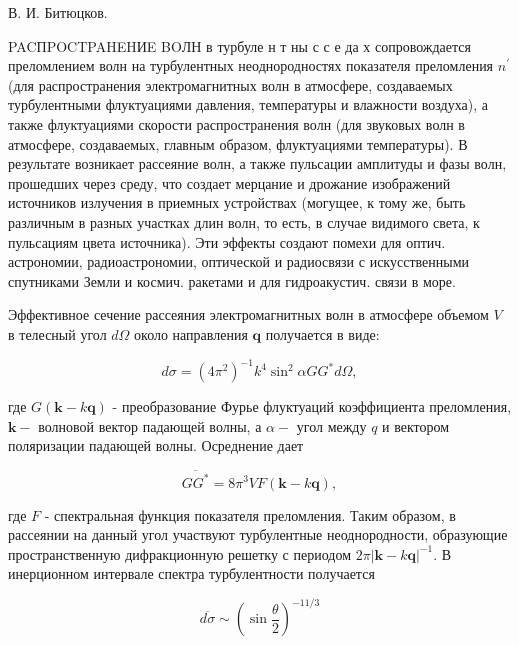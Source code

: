 \documentclass[10pt]{article}
\begin{document}
В. И. Битюцков.



PACПPOCTPAHEHИE BOЛН в турбуле н т ны с с е да х сопровождается преломлением волн на турбулентных неоднородностях показателя преломления $n^{\prime}$ (для распространения электромагнитных волн в атмосфере, создаваемых турбулентными флуктуациями давления, температуры и влажности воздуха), а также флуктуациями скорости распространения волн (для звуковых волн в атмосфере, создаваемых, главным образом, флуктуациями температуры). В результате возникает рассеяние волн, а также пульсации амплитуды и фазы волн, прошедших через среду, что создает мерцание и дрожание изображений источников излучения в приемных устройствах (могущее, к тому же, быть различным в разных участках длин волн, то есть, в случае видимого света, к пульсациям цвета источника). Эти эффекты создают помехи для оптич. астрономии, радиоастрономии, оптической и радиосвязи с искусственными спутниками Земли и космич. ракетами и для гидроакустич. связи в море.



Эффективное сечение рассеяния электромагнитных волн в атмосфере объемом $V$ в телесный угол $d \Omega$ около направления $\boldsymbol{q}$ получается в виде:



\[

d \sigma=\left(4 \pi^{2}\right)^{-1} k^{4} \sin ^{2} \alpha G G^{*} d \Omega,

\]



где $G(\boldsymbol{k}-k \boldsymbol{q})$ - преобразование Фурье флуктуаций коэффициента преломления, $\boldsymbol{k}-$ волновой вектор падающей волны, а $\alpha-$ угол между $q$ и вектором поляризации падающей волны. Осреднение дает



\[

\overline{G G^{*}}=8 \pi^{3} V F(\boldsymbol{k}-k \boldsymbol{q}),

\]



где $F$ - спектральная функция показателя преломления. Таким образом, в рассеянии на данный угол участвуют турбулентные неоднородности, образующие пространственную дифракционную решетку с периодом $2 \pi|\boldsymbol{k}-k \boldsymbol{q}|^{-1}$. В инерционном интервале спектра турбулентности получается



\[

\overline{d \sigma} \sim\left(\sin \frac{\theta}{2}\right)^{-11 / 3}

\]
\end{document}
